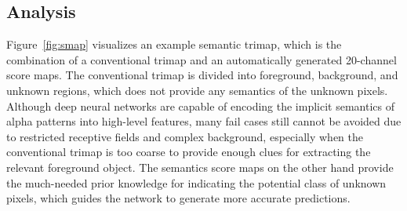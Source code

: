 \documentclass[10pt,twocolumn,letterpaper]{article}
\newcommand\cspace{15}
\newcommand\cspaceadd{2}
\begin{document}
\begin{table}[t]
    \centering
    \vspace{1pt}
    \caption{Ablation studies. The basic model is trained with reconstruction losses. ``S", ``D", ``G" denotes semantic trimap , multi-class discriminator and gradient-related losses respectively.}
    \label{tab:submodule}
    \vspace{-\cspace pt}
    \vspace{1pt}
\end{table}

\vspace{-2pt}
\subsection{Analysis}
\vspace{\cspaceadd pt}
\vspace{-2pt}
Figure~\ref{fig:smap} visualizes an example semantic trimap, which is the combination of a conventional trimap and an automatically generated 20-channel score maps. The conventional trimap is divided into foreground, background, and unknown regions, which does not provide any semantics of the unknown pixels. Although deep neural networks are capable of encoding the implicit semantics of alpha patterns into high-level features, many fail cases still cannot be avoided due to restricted receptive fields and complex background, especially when the conventional trimap is too coarse to provide enough clues for extracting the relevant foreground object. The semantics score maps on the other hand provide the much-needed prior knowledge for indicating the potential class of unknown pixels, which guides the network to generate more accurate predictions. 


\vspace{\cspaceadd pt}
\vspace{4pt}
\end{document}
